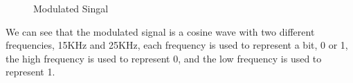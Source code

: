 \documentclass[12pt]{article}
\begin{document}
\begin{figure}[H]
    \centering
    \caption{Modulated Singal}
\end{figure}
We can see that the modulated signal is a cosine wave with two different frequencies, 15KHz and 25KHz, each frequency is used to represent a bit, 0 or 1, the high frequency is used to represent 0, and the low frequency is used to represent 1.
\end{document}
